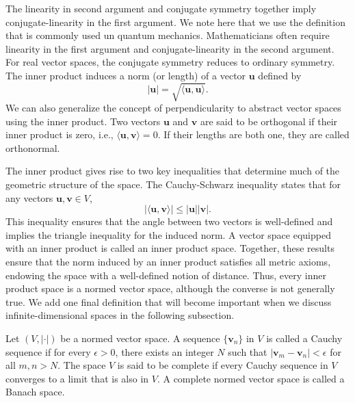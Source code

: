 The linearity in second argument and conjugate symmetry together imply conjugate-linearity in the first argument. We note here that we use the definition that is commonly used un quantum mechanics.\supercite{1164152357,633612145} Mathematicians often require linearity in the first argument and conjugate-linearity in the second argument. For real vector spaces, the conjugate symmetry reduces to ordinary symmetry. The inner product induces a norm (or length) of a vector $\symbf{u}$ defined by
\begin{equation}
\lvert\symbf{u}\rvert=\sqrt{\langle\symbf{u},\symbf{u}\rangle}.
\end{equation}
We can also generalize the concept of perpendicularity to abstract vector spaces using the inner product. Two vectors $\symbf{u}$ and $\symbf{v}$ are said to be orthogonal if their inner product is zero, i.e., $\langle\symbf{u},\symbf{v}\rangle=0$. If their lengths are both one, they are called orthonormal.

The inner product gives rise to two key inequalities that determine much of the geometric structure of the space. The Cauchy-Schwarz inequality states that for any vectors $\symbf{u},\symbf{v}\in V$,
\begin{equation}
\lvert\langle\symbf{u},\symbf{v}\rangle\rvert\leq\lvert\symbf{u}\rvert\lvert\symbf{v}\rvert.
\end{equation}
This inequality ensures that the angle between two vectors is well-defined and implies the triangle inequality for the induced norm. A vector space equipped with an inner product is called an inner product space. Together, these results ensure that the norm induced by an inner product satisfies all metric axioms, endowing the space with a well-defined notion of distance.\supercite{633612145} Thus, every inner product space is a normed vector space, although the converse is not generally true. We add one final definition that will become important when we discuss infinite-dimensional spaces in the following subsection.
\begin{definition}
Let $(V,\lvert\cdot\rvert)$ be a normed vector space. A sequence $\lbrace\symbf{v}_n\rbrace$ in $V$ is called a Cauchy sequence if for every $\epsilon>0$, there exists an integer $N$ such that $\lvert\symbf{v}_m-\symbf{v}_n\rvert<\epsilon$ for all $m,n>N$. The space $V$ is said to be complete if every Cauchy sequence in $V$ converges to a limit that is also in $V$. A complete normed vector space is called a Banach space.
\end{definition}

